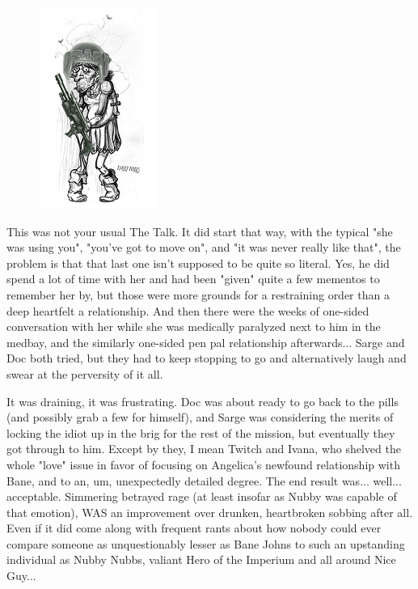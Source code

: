 \begin{figure}
	\begin{center}
		\includegraphics[width=\figwidth]{pics/19/22.png}
	\end{center}
\end{figure}
This was not your usual The Talk. 
It did start that way, with the typical "she was using you", "you've got to move on", and "it was never really like that", the problem is that that last one isn't supposed to be quite so literal. 
Yes, he did spend a lot of time with her and had been "given" quite a few mementos to remember her by, but those were more grounds for a restraining order than a deep heartfelt a relationship. 
And then there were the weeks of one-sided conversation with her while she was medically paralyzed next to him in the medbay, and the similarly one-sided pen pal relationship afterwards... 
Sarge and Doc both tried, but they had to keep stopping to go and alternatively laugh and swear at the perversity of it all. 


It was draining, it was frustrating. 
Doc was about ready to go back to the pills (and possibly grab a few for himself), and Sarge was considering the merits of locking the idiot up in the brig for the rest of the mission, but eventually they got through to him. 
Except by they, I mean Twitch and Ivana, who shelved the whole "love" issue in favor of focusing on Angelica's newfound relationship with Bane, and to an, um, unexpectedly detailed degree. 
The end result was... 
well... 
acceptable. 
Simmering betrayed rage (at least insofar as Nubby was capable of that emotion), WAS an improvement over drunken, heartbroken sobbing after all. 
Even if it did come along with frequent rants about how nobody could ever compare someone as unquestionably lesser as Bane Johns to such an upstanding individual as Nubby Nubbs, valiant Hero of the Imperium and all around Nice Guy... 



